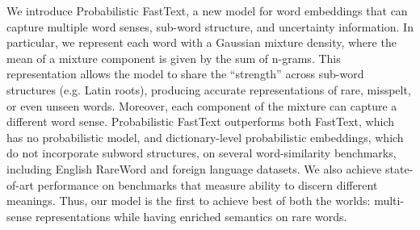 We introduce Probabilistic FastText, a new model for word embeddings that can capture multiple word senses, sub-word structure, and uncertainty information. In particular, we represent each word with a Gaussian mixture density, where the mean of a mixture component is given by the sum of n-grams.  This representation allows the model to share the ``strength'' across sub-word structures (e.g. Latin roots), producing accurate representations of rare, misspelt, or even unseen words. Moreover, each component of the mixture can capture a different word sense. Probabilistic FastText outperforms both FastText, which has no probabilistic model, and dictionary-level probabilistic embeddings, which do not incorporate subword structures, on several word-similarity benchmarks, including English RareWord and foreign language datasets. We also achieve state-of-art performance on benchmarks that measure ability to discern different meanings. Thus, our model is the first to achieve best of both the worlds: multi-sense representations while having enriched semantics on rare words.
